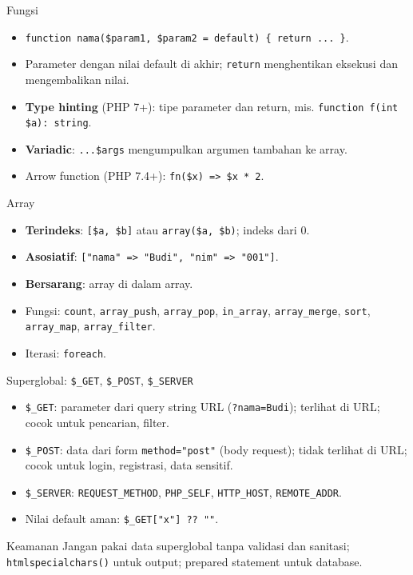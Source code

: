 \documentclass[handout]{beamer}
\begin{document}
\begin{frame}{Fungsi}
	\begin{itemize}
		\item \texttt{function nama(\$param1, \$param2 = default) \{ return ... \}}.
		\item Parameter dengan nilai default di akhir; \texttt{return} menghentikan eksekusi dan mengembalikan nilai.
		\item \textbf{Type hinting} (PHP 7+): tipe parameter dan return, mis. \texttt{function f(int \$a): string}.
		\item \textbf{Variadic}: \texttt{...\$args} mengumpulkan argumen tambahan ke array.
		\item Arrow function (PHP 7.4+): \texttt{fn(\$x) => \$x * 2}.
	\end{itemize}
\end{frame}

\begin{frame}{Array}
	\begin{itemize}
		\item \textbf{Terindeks}: \texttt{[\$a, \$b]} atau \texttt{array(\$a, \$b)}; indeks dari 0.
		\item \textbf{Asosiatif}: \texttt{["nama" => "Budi", "nim" => "001"]}.
		\item \textbf{Bersarang}: array di dalam array.
		\item Fungsi: \texttt{count}, \texttt{array\_push}, \texttt{array\_pop}, \texttt{in\_array}, \texttt{array\_merge}, \texttt{sort}, \texttt{array\_map}, \texttt{array\_filter}.
		\item Iterasi: \texttt{foreach}.
	\end{itemize}
\end{frame}

\begin{frame}{Superglobal: \texttt{\$\_GET}, \texttt{\$\_POST}, \texttt{\$\_SERVER}}
	\begin{itemize}
		\item \texttt{\$\_GET}: parameter dari query string URL (\texttt{?nama=Budi}); terlihat di URL; cocok untuk pencarian, filter.
		\item \texttt{\$\_POST}: data dari form \texttt{method="post"} (body request); tidak terlihat di URL; cocok untuk login, registrasi, data sensitif.
		\item \texttt{\$\_SERVER}: \texttt{REQUEST\_METHOD}, \texttt{PHP\_SELF}, \texttt{HTTP\_HOST}, \texttt{REMOTE\_ADDR}.
		\item Nilai default aman: \texttt{\$\_GET["x"] ?? ""}.
	\end{itemize}
	\begin{block}{Keamanan}
		Jangan pakai data superglobal tanpa validasi dan sanitasi; \texttt{htmlspecialchars()} untuk output; prepared statement untuk database.
	\end{block}
\end{frame}
\end{document}

